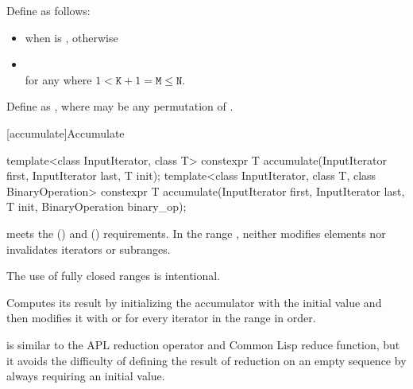 %
\pnum
Define 
as follows:
\begin{itemize}
\item
{} when  is , otherwise

\item
{} \\
for any  where $1 < \mathtt{K}+1 = \mathtt{M} \leq \mathtt{N}$.
\end{itemize}

%
\pnum
Define  as
,
where
 may be any permutation of .

[accumulate]{Accumulate}

%
\begin{itemdecl}
template<class InputIterator, class T>
  constexpr T accumulate(InputIterator first, InputIterator last, T init);
template<class InputIterator, class T, class BinaryOperation>
  constexpr T accumulate(InputIterator first, InputIterator last, T init,
                         BinaryOperation binary_op);
\end{itemdecl}

\begin{itemdescr}
\pnum
\expects
{} meets
the  ()
and  () requirements.
In the range ,
 neither modifies elements
nor invalidates iterators or subranges.
\begin{footnote}
The use of fully closed ranges is intentional.
\end{footnote}

\pnum
\effects
Computes its result by
initializing the accumulator  with the initial value 
and then modifies it with
 or
for every iterator  in the range  in order.
\begin{footnote}
 is similar
to the APL reduction operator and Common Lisp reduce function,
but it avoids the difficulty of defining the result of reduction
on an empty sequence by always requiring an initial value.
\end{footnote}
\end{itemdescr}

